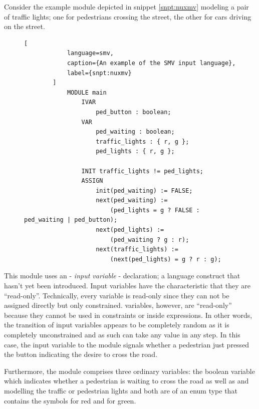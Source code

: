 \begin{example}
    Consider the example module depicted in snippet \ref{snpt:nuxmv} modeling a pair of traffic lights; one for pedestrians crossing the street, the other for cars driving on the street.

    \begin{figure}
        \begin{lstlisting}[
            language=smv,
            caption={An example of the SMV input language},
            label={snpt:nuxmv}
        ]
            MODULE main
                IVAR
                    ped_button : boolean;
                VAR
                    ped_waiting : boolean;
                    traffic_lights : { r, g };
                    ped_lights : { r, g };

                INIT traffic_lights != ped_lights;
                ASSIGN
                    init(ped_waiting) := FALSE;
                    next(ped_waiting) :=
                        (ped_lights = g ? FALSE : ped_waiting | ped_button);
                    next(ped_lights) :=
                        (ped_waiting ? g : r);
                    next(traffic_lights) :=
                        (next(ped_lights) = g ? r : g);
        \end{lstlisting}
    \end{figure}

    This module uses an  - \textit{input variable} - declaration; a language construct that hasn't yet been introduced.
    Input variables have the characteristic that they are \enquote{read-only}.
    Technically, every variable is read-only since they can not be assigned directly but only constrained.
     variables, however, are \enquote{read-only} because they cannot be used in  constraints or inside  expressions.
    In other words, the transition of input variables appears to be completely random as it is completely unconstrained and as such can take any value in any step.
    In this case, the input variable to the module signals whether a pedestrian just pressed the button indicating the desire to cross the road.

    Furthermore, the module comprises three ordinary variables: the boolean variable  which indicates whether a pedestrian is waiting to cross the road as well as  and  modelling the traffic or pedestrian lights and both are of an enum type that contains the symbols  for red and  for green.


\end{example}
